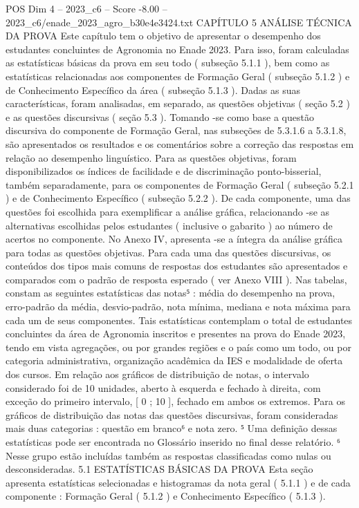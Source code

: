 \begin{textsample}{POS Dim 4 – 2023\_c6 – Score -8.00 – 2023\_c6/enade\_2023\_agro\_b30e4e3424.txt}  \label{ex:f4_pos_340}
CAPÍTULO 5 ANÁLISE TÉCNICA DA PROVA Este capítulo tem o objetivo de apresentar o desempenho dos estudantes concluintes de Agronomia no Enade 2023.
Para isso, foram calculadas as estatísticas básicas da prova em seu todo ( subseção 5.1.1 ), bem como as estatísticas relacionadas aos componentes de Formação Geral ( subseção 5.1.2 ) e de Conhecimento Específico da área ( subseção 5.1.3 ).
Dadas as suas características, foram analisadas, em separado, as questões objetivas ( seção 5.2 ) e as questões discursivas ( seção 5.3 ).
Tomando -se como base a questão discursiva do componente de Formação Geral, nas subseções de 5.3.1.6 a 5.3.1.8, são apresentados os resultados e os comentários sobre a correção das respostas em relação ao desempenho linguístico.
Para as questões objetivas, foram disponibilizados os índices de facilidade e de discriminação ponto-bisserial, também separadamente, para os componentes de Formação Geral ( subseção 5.2.1 ) e de Conhecimento Específico ( subseção 5.2.2 ).
De cada componente, uma das questões foi escolhida para exemplificar a análise gráfica, relacionando -se as alternativas escolhidas pelos estudantes ( inclusive o gabarito ) ao número de acertos no componente.
No Anexo IV, apresenta -se a íntegra da análise gráfica para todas as questões objetivas.
Para cada uma das questões discursivas, os conteúdos dos tipos mais comuns de respostas dos estudantes são apresentados e comparados com o padrão de resposta esperado ( ver Anexo VIII ).
Nas tabelas, constam as seguintes estatísticas das notas⁵ : média do desempenho na prova, erro-padrão da média, desvio-padrão, nota mínima, mediana e nota máxima para cada um de seus componentes.
Tais estatísticas contemplam o total de estudantes concluintes da área de Agronomia inscritos e presentes na prova do Enade 2023, tendo em vista agregações, ou por grandes regiões e o país como um todo, ou por categoria administrativa, organização acadêmica da IES e modalidade de oferta dos cursos.
Em relação aos gráficos de distribuição de notas, o intervalo considerado foi de 10 unidades, aberto à esquerda e fechado à direita, com exceção do primeiro intervalo, [ 0 ; 10 ], fechado em ambos os extremos.
Para os gráficos de distribuição das notas das questões discursivas, foram consideradas mais duas categorias : questão em branco⁶ e nota zero. ⁵ Uma definição dessas estatísticas pode ser encontrada no Glossário inserido no final desse relatório. ⁶ Nesse grupo estão incluídas também as respostas classificadas como nulas ou desconsideradas. 5.1 ESTATÍSTICAS BÁSICAS DA PROVA Esta seção apresenta estatísticas selecionadas e histogramas da nota geral ( 5.1.1 ) e de cada componente : Formação Geral ( 5.1.2 ) e Conhecimento Específico ( 5.1.3 ).

\end{textsample}
